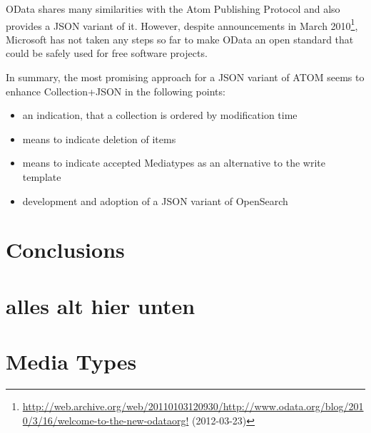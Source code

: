 \documentclass[12pt,a4paper,twoside]{scrartcl}		%
\newcommand{\citeurl}[2]{\url{#1} (#2)}
\begin{document}
OData shares many similarities with the Atom Publishing Protocol and also
provides a JSON variant of it. However, despite announcements in March
2010\footnote{\citeurl{http://web.archive.org/web/20110103120930/http://www.odata.org/blog/2010/3/16/welcome-to-the-new-odataorg!}{2012-03-23}},
Microsoft has not taken any steps so far to make OData an open standard that
could be safely used for free software projects.

In summary, the most promising approach for a JSON variant of ATOM seems to
enhance Collection+JSON in the following points:

\begin{itemize}
\item an indication, that a collection is ordered by modification time
\item means to indicate deletion of items
\item means to indicate accepted Mediatypes as an alternative to the write
  template
\item development and adoption of a JSON variant of OpenSearch
\end{itemize}


\section{Conclusions}
\label{sec:conclusions}



\section{alles alt hier unten}





\section{Media Types}
\end{document}
